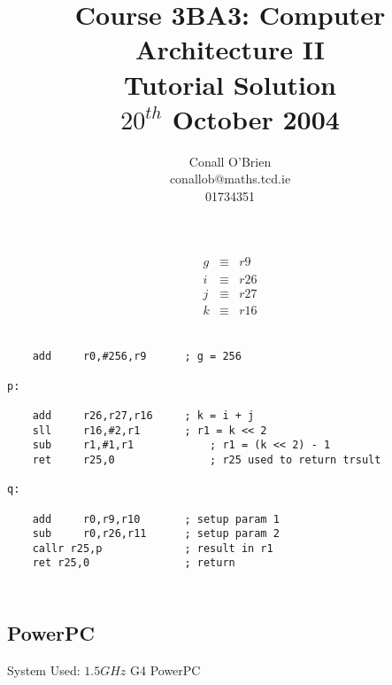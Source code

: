\documentclass[a4paper,12pt]{article}
\begin{document}
\title{Course 3BA3: Computer Architecture II \\ Tutorial Solution\\ $20^{th}$ October 2004}

\author{Conall O'Brien \\ conallob@maths.tcd.ie \\ 01734351}

\maketitle

\section{}

\begin{eqnarray*}
g & \equiv & r9 \\
i & \equiv & r26 \\
j & \equiv & r27 \\
k & \equiv & r16 \\
\end{eqnarray*}

\begin{verbatim}

	add 	r0,#256,r9		; g = 256

p:

	add 	r26,r27,r16		; k = i + j
	sll 	r16,#2,r1		; r1 = k << 2
	sub 	r1,#1,r1			; r1 = (k << 2) - 1
	ret 	r25,0				; r25 used to return trsult

q:

	add 	r0,r9,r10		; setup param 1
	sub 	r0,r26,r11		; setup param 2
	callr r25,p				; result in r1
	ret	r25,0				; return
	
\end{verbatim}

\section{}

\section{}

\subsection*{PowerPC}

System Used: 	$1.5GHz$	G4 PowerPC
\end{document}
